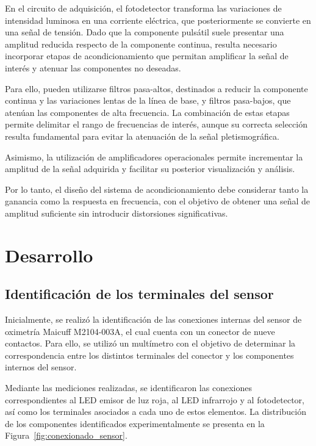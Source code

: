 \documentclass[10pt]{article}
\begin{document}
En el circuito de adquisición, el fotodetector transforma las variaciones de intensidad luminosa en una corriente eléctrica, que posteriormente se convierte en una señal de tensión. Dado que la componente pulsátil suele presentar una amplitud reducida respecto de la componente continua, resulta necesario incorporar etapas de acondicionamiento que permitan amplificar la señal de interés y atenuar las componentes no deseadas.

Para ello, pueden utilizarse filtros pasa-altos, destinados a reducir la componente continua y las variaciones lentas de la línea de base, y filtros pasa-bajos, que atenúan las componentes de alta frecuencia. La combinación de estas etapas permite delimitar el rango de frecuencias de interés, aunque su correcta selección resulta fundamental para evitar la atenuación de la señal pletismográfica.

Asimismo, la utilización de amplificadores operacionales permite incrementar la amplitud de la señal adquirida y facilitar su posterior visualización y análisis. 

Por lo tanto, el diseño del sistema de acondicionamiento debe considerar tanto la ganancia como la respuesta en frecuencia, con el objetivo de obtener una señal de amplitud suficiente sin introducir distorsiones significativas.


\section{Desarrollo}

\subsection{Identificación de los terminales del sensor}

Inicialmente, se realizó la identificación de las conexiones internas del sensor de oximetría Maicuff M2104-003A, el cual cuenta con un conector de nueve contactos. Para ello, se utilizó un multímetro con el objetivo de determinar la correspondencia entre los distintos terminales del conector y los componentes internos del sensor.

Mediante las mediciones realizadas, se identificaron las conexiones correspondientes al LED emisor de luz roja, al LED infrarrojo y al fotodetector, así como los terminales asociados a cada uno de estos elementos. La distribución de los componentes identificados experimentalmente se presenta en la Figura~\ref{fig:conexionado_sensor}.
\end{document}
